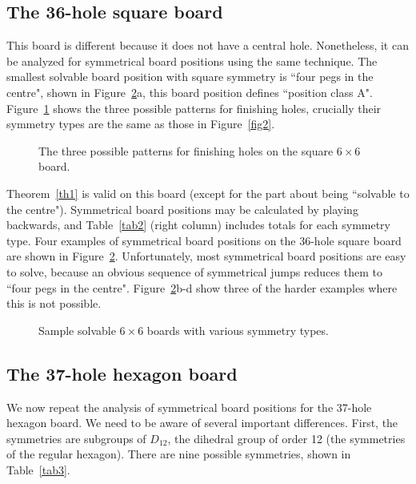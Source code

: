 \documentclass[12pt,reqno]{article}
\begin{document}
\subsection{The 36-hole square board}
\label{sec:sym36}

This board is different because it does not have a central hole.
Nonetheless, it can be analyzed for symmetrical board positions using the same technique.
The smallest solvable board position with square symmetry is
``four pegs in the centre",
shown in Figure~\ref{fig12}a, this board position defines ``position class A".
Figure~\ref{fig11} shows the three possible patterns for finishing holes,
crucially their symmetry types are the same as those in Figure~\ref{fig2}.

\begin{figure}[htb]
\centering
{}
\caption{The three possible patterns for finishing holes on the square $6\times 6$ board.}
\label{fig11}
\end{figure}

Theorem~\ref{th1} is valid on this board
(except for the part about being ``solvable to the centre").
Symmetrical board positions may be calculated by playing backwards,
and Table~\ref{tab2} (right column) includes totals for each symmetry type.
Four examples of symmetrical board positions on the 36-hole square board 
are shown in Figure~\ref{fig12}.
Unfortunately, most symmetrical board positions are easy to solve,
because an obvious sequence of symmetrical jumps reduces them to ``four pegs in the centre".
Figure~\ref{fig12}b-d show three of the harder examples where this is not possible.

\begin{figure}[htb]
\centering
{}
\caption{Sample solvable $6\times 6$ boards with various symmetry types.}
\label{fig12}
\end{figure}

\subsection{The 37-hole hexagon board}
\label{sec:symHex}

We now repeat the analysis of symmetrical board positions for the 37-hole hexagon board.
We need to be aware of several important differences.
First, the symmetries are subgroups of $D_{12}$, the dihedral group of order 12
(the symmetries of the regular hexagon).
There are nine possible symmetries, shown in Table~\ref{tab3}.
\end{document}
